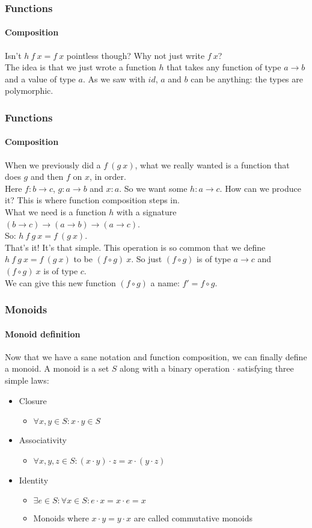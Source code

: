 \documentclass{beamer}
\begin{document}
\begin{frame}
  \frametitle{Functions}
  \framesubtitle{Composition}
  Isn't $h\:f\:x = f\:x$ pointless though? Why not just write $f\:x$?\\
  \pause
  The idea is that we just wrote a function $h$ that takes any
  function of type $a \rightarrow b$ and a value of type $a$. As we saw with $id$,
  $a$ and $b$ can be anything: the types are polymorphic.
\end{frame}
\begin{frame}
  \frametitle{Functions}
  \framesubtitle{Composition}
  When we previously did a $f\:(g\:x)$, what we really wanted is a
  function that does $g$ and then $f$ on $x$, in order.\\
  Here $f:b \rightarrow c$, $g:a \rightarrow b$ and $x:a$.
  \pause
  So we want some $h:a \rightarrow c$. How can we produce it? This is
  where function composition steps in.\\
  \pause
  What we need is a function $h$ with a signature $(b \rightarrow c)
  \rightarrow (a \rightarrow b) \rightarrow (a \rightarrow c)$.\\
  So: $h\:f\:g\:x = f\:(g\:x)$.\\
  \pause
  That's it! It's that simple. This operation is so common that we
  define $h\:f\:g\:x = f\:(g\:x)$ to be $(f \circ g)\:x$. So just $(f
  \circ g)$ is of type $a \rightarrow c$ and $(f \circ g)\:x$ is of
  type $c$.\\
  \pause
  We can give this new function $(f \circ g)$ a name: $f' = f \circ g$.
\end{frame}
\begin{frame}
  \frametitle{Monoids}
  \framesubtitle{Monoid definition}
  Now that we have a sane notation and function composition, we can
  finally define a monoid. A monoid is a set $S$ along with a binary
  operation $\cdot$ satisfying three simple laws:
  \pause
  \begin{itemize}[<+->]
    \item Closure
      \begin{itemize}
        \item $\forall x,y \in S: x \cdot y \in S$
      \end{itemize}
    \item Associativity
      \begin{itemize}
        \item $\forall x,y,z \in S: (x \cdot y) \cdot z = x \cdot (y
          \cdot z)$
      \end{itemize}
    \item Identity
      \begin{itemize}
        \item $\exists e \in S: \forall x \in S: e \cdot x = x \cdot e
          = x$
        \item Monoids where $x \cdot y = y \cdot x$ are called
          commutative monoids
      \end{itemize}
  \end{itemize}
\end{frame}
\end{document}

